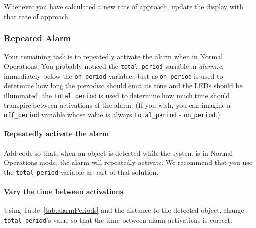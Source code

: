 Whenever you have calculated a new rate of approach, update the display with that rate of approach.


\subsubsection{Repeated Alarm} \label{subsubsec:repeatedAlarm}

Your remaining task is to repeatedly activate the alarm when in Normal Operations.
You probably noticed the \lstinline{total_period} variable in \textit{alarm.c}, immediately below the \lstinline{on_period} variable.
Just as \lstinline{on_period} is used to determine how long the piezodisc should emit its tone and the LEDs should be illuminated, the \lstinline{total_period} is used to determine how much time should transpire between activations of the alarm.
(If you wish, you can imagine a \lstinline{off_period} variable whose value is always \lstinline{total_period} - \lstinline{on_period}.)

\paragraph{Repeatedly activate the alarm}
Add code so that, when an object is detected while the system is in Normal Operations mode, the alarm will repeatedly activate.
We recommend that you use the \lstinline{total_period} variable as part of that solution.

\paragraph{Vary the time between activations}
Using Table~\ref{tab:alarmPeriods} and the distance to the detected object, change \lstinline{total_period}'s value so that the time between alarm activations is correct.
